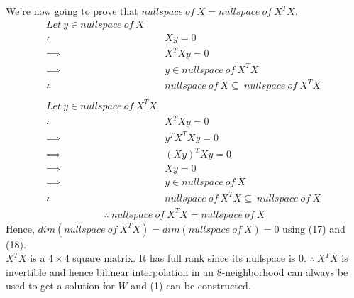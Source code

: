 \documentclass[a4paper,fleqn,11pt]{article}
\theoremstyle{mytheor}
\begin{document}
We're now going to prove that $nullspace\ of\ X = nullspace\ of\ X^TX$.
\begin{align*}
Let\ y \in nullspace\ of\ X \\
\therefore\ & Xy = 0 \\
\implies\ & X^TXy = 0 \\
\implies\ & y \in nullspace\ of\ X^TX \\
\therefore\ & nullspace\ of\ X \subseteq\ nullspace\ of\ X^TX \\
\\
Let\ y \in nullspace\ of\ X^TX \\
\therefore\ & X^TXy = 0 \\
\implies\ & y^TX^TXy = 0 \\
\implies\ & (Xy)^TXy = 0 \\
\implies\ & Xy = 0 \\
\implies\ & y \in nullspace\ of\ X \\
\therefore\ & nullspace\ of\ X^TX \subseteq\ nullspace\ of\ X\
\end{align*}
\begin{align}
\therefore\ nullspace\ of\ X^TX = nullspace\ of\ X
\end{align}
Hence, $dim(nullspace\ of\ X^TX) = dim(nullspace\ of\ X) = 0$ using (17) and (18). \\
$X^TX$ is a $4\times4$ square matrix. It has full rank since its nullspace is 0. $\therefore\ X^TX$ is invertible and hence bilinear interpolation in an 8-neighborhood can always be used to get a solution for $W$ and (1) can be constructed.

\pagebreak
\end{document}
